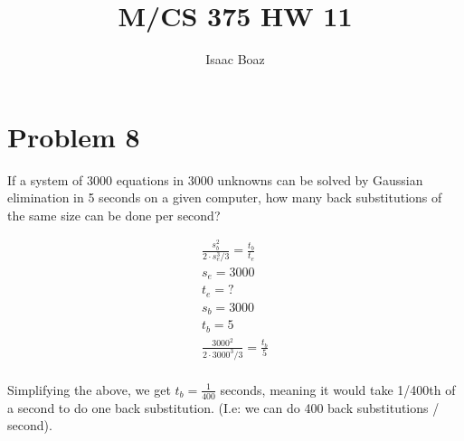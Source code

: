 \documentclass{article}
\title{\vspace{-5ex}M/CS 375 HW 11}
\author{Isaac Boaz}
\begin{document}
\maketitle

\section*{Problem 8}
If a system of 3000 equations in 3000 unknowns can be solved by Gaussian elimination in 5 seconds on a given computer, how many back substitutions of the same size can be done per second?

\begin{align*}
    \frac{s_b ^2}{2 \cdot s_e^3 / 3} = \frac{t_b}{t_e} \\
    s_e = 3000                                         \\
    t_e = ?                                            \\
    s_b = 3000                                         \\
    t_b = 5                                            \\
    \frac{3000^2}{2 \cdot 3000^3 / 3} = \frac{t_b}{5}  \\
\end{align*}

Simplifying the above, we get \(t_b = \frac{1}{400}\) seconds, meaning it would take 1/400th of a second to do one back substitution. (I.e: we can do 400 back substitutions / second).
\end{document}
